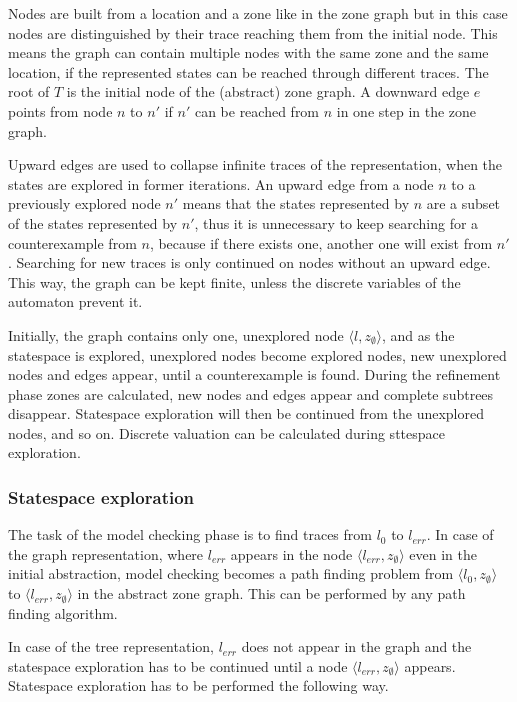 Nodes are built from a location and a zone like in the zone graph but in this case nodes are distinguished by their trace reaching them from the initial node. This means the graph can contain multiple nodes with the same zone and the same location, if the represented states can be reached through different traces. The root of $T$ is the initial node of the (abstract) zone graph. A downward edge $e$ points from node $n$ to $n'$ if $n'$ can be reached from $n$ in one step in the zone graph. %

Upward edges are used to collapse infinite traces of the representation, when the states are explored in former iterations. An upward edge from a node $n$ to a previously explored node $n'$ means that the states
represented by $n$ are a subset of the states represented by $n'$, thus it is unnecessary to keep searching for a
counterexample from $n$, because if there exists one, another one will exist
from $n'$. Searching for new traces is only continued on nodes without an upward edge. This way, the graph can be kept finite, unless the discrete variables of the automaton prevent it.

Initially, the graph contains only one, unexplored node $\langle l, z_{\emptyset} \rangle$, and as the statespace is explored, unexplored nodes become explored nodes, new unexplored nodes and edges appear, until a counterexample is found. During the refinement phase zones are calculated, new nodes and edges appear and complete subtrees disappear. Statespace exploration will then be continued from the unexplored nodes, and so on. Discrete valuation can be calculated during sttespace exploration.


\subsubsection{Statespace exploration}

The task of the model checking phase is to find traces from $l_0$ to $l_{err}$. In case of the graph representation, where $l_{err}$ appears in the node  $\langle l_{err}, z_{\emptyset} \rangle$ even in the initial abstraction, model checking becomes a path finding problem from $\langle l_{0}, z_{\emptyset} \rangle$ to $\langle l_{err}, z_{\emptyset} \rangle$ in the abstract zone graph. This can be performed by any path finding algorithm.


In case of the tree representation, $l_{err}$ does not appear in the graph and the statespace exploration has to be continued until a node $\langle l_{err}, z_{\emptyset} \rangle$ appears. Statespace exploration has to be performed the following way.

